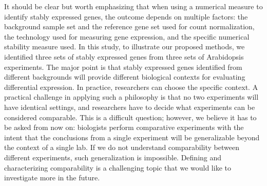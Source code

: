 \documentclass[fleqn,10pt,lineno]{wlpeerj} %
\begin{document}
			
			It should be clear but worth emphasizing that when using a numerical measure
			to identify stably expressed genes, the outcome depends on multiple factors:
			the background sample set and the reference gene set used for count
			normalization, the technology used
			for measuring gene expression, and the specific numerical stability measure
			used.  In this study, to illustrate our proposed methods, we identified three
			sets of stably expressed genes from three sets of Arabidopsis experiments. The
			major point is that stably expressed genes identified from different
			backgrounds will provide different biological contexts for evaluating
			differential expression. In practice, researchers can choose the specific
			context. A practical challenge in applying such a philosophy is that no two
			experiments will have identical settings, and researchers have to decide what
			experiments can be considered comparable. This is a difficult question;
			however, we believe it has to be asked from now on: biologists perform
			comparative experiments with the intent that the conclusions from a single
			experiment will be generalizable beyond the context of a single lab. If we do
			not understand comparability between different experiments, such
			generalization is impossible. Defining and characterizing comparability is a
			challenging topic that we would like to investigate more in the future.
			
			
			
\end{document}
